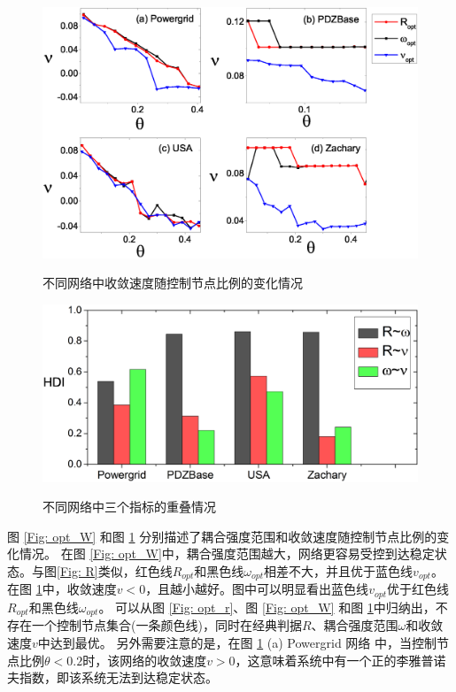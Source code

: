 \begin{figure}[hp]%
	\centering
	\includegraphics[width=0.9\columnwidth]{chapter3Fig/V.eps}\\
	\caption{不同网络中收敛速度随控制节点比例的变化情况}
	\label{Fig: opt_V}	
	
\end{figure}

\begin{figure}[hp]%
	\centering
	\includegraphics[width=0.8\columnwidth]{chapter3Fig/overlap.eps}\\
	\caption{不同网络中三个指标的重叠情况}
	\label{Fig: chap2overlap}		
\end{figure}

图 \ref{Fig: opt_W} 和图 \ref{Fig: opt_V} 分别描述了耦合强度范围和收敛速度随控制节点比例的变化情况。
在图 \ref{Fig: opt_W}中，耦合强度范围越大，网络更容易受控到达稳定状态。与图\ref{Fig: R}类似，红色线$ R_{opt} $和黑色线$ \omega_{opt} $相差不大，并且优于蓝色线$ v_{opt} $。
在图 \ref{Fig: opt_V}中，收敛速度$ v<0 $，且越小越好。图中可以明显看出蓝色线$ v_{opt} $优于红色线$ R_{opt} $和黑色线$ \omega_{opt} $。
可以从图 \ref{Fig: opt_r}、图 \ref{Fig: opt_W} 和图 \ref{Fig: opt_V}中归纳出，不存在一个控制节点集合(一条颜色线)，同时在经典判据$ R $、耦合强度范围$ \omega $和收敛速度$ v $中达到最优。
另外需要注意的是，在图 \ref{Fig: opt_V} (a) Powergrid 网络 中，当控制节点比例$ \theta<0.2 $时，该网络的收敛速度$ v>0 $，这意味着系统中有一个正的李雅普诺夫指数，即该系统无法到达稳定状态。


